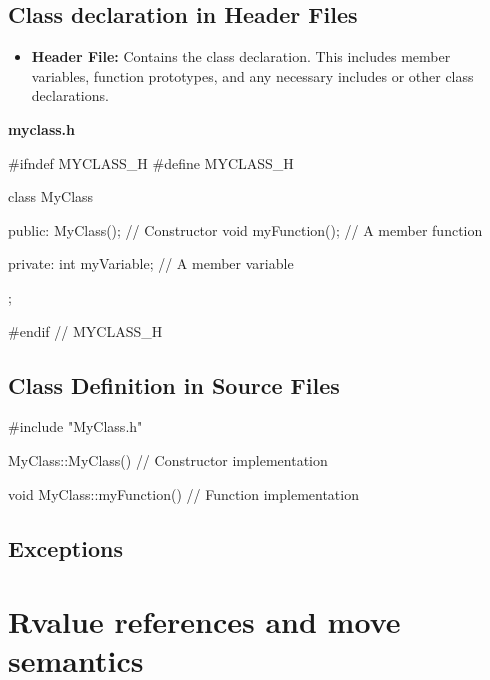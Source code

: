 \documentclass{report}
\begin{document}
    \subsection{Class declaration in Header Files}
    \bigbreak \noindent 
    \begin{itemize}
        \item \textbf{Header File:} Contains the class declaration. This includes member variables, function prototypes, and any necessary includes or other class declarations.
    \end{itemize}
    \bigbreak \noindent 
    \textbf{myclass.h}
    \bigbreak \noindent 
    \begin{cppcode}
#ifndef MYCLASS_H
#define MYCLASS_H

class MyClass {
public:
    MyClass(); // Constructor
    void myFunction(); // A member function

private:
    int myVariable; // A member variable
};

#endif // MYCLASS_H
    \end{cppcode}

    \bigbreak \noindent 
    \subsection{Class Definition in Source Files}
    \bigbreak \noindent 
    \begin{cppcode}
#include "MyClass.h"

MyClass::MyClass() {
    // Constructor implementation
}

void MyClass::myFunction() {
    // Function implementation
}
    \end{cppcode}

    \pagebreak \bigbreak \noindent 
    \subsection{Exceptions}
    \bigbreak \noindent 


    \pagebreak \bigbreak \noindent 
    \section{\LARGE Rvalue references and move semantics}
    \bigbreak \noindent 





    



	

	




    
\end{document}
